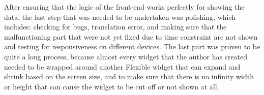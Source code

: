 
After ensuring that the logic of the front-end works perfectly for showing the data, the last step that was needed to be undertaken
was polishing, which includes: checking for bugs, translation error, and making sure that the malfunctioning part that
were not yet fixed due to time constraint are not shown and testing for responsiveness on different devices. The last part was
proven to be quite a long process, because almost every widget that the author has created needed to be wrapped around another
Flexible widget that can expand and shrink based on the screen size, and to make sure that there is no infinity width or height
that can cause the widget to be cut off or not shown at all.



